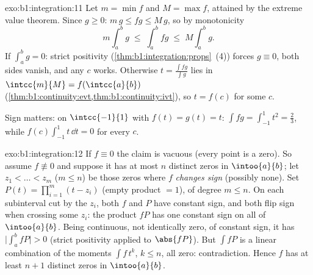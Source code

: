 \begin{solution}{exo:b1:integration:11}
Let $m = \min f$ and $M = \max f$, attained by the extreme value
theorem. Since $g \geq 0$: $m\,g \leq fg \leq M\,g$, so by
monotonicity
\[
m \int_a^b g \;\leq\; \int_a^b fg \;\leq\; M \int_a^b g .
\]
If $\int_a^b g = 0$: strict positivity
(\cref{thm:b1:integration:props}~(4)) forces $g \equiv 0$, both
sides vanish, and any $c$ works. Otherwise $t = \frac{\int
fg}{\int g}$ lies in $\intcc{m}{M} = f(\intcc{a}{b})$
(\cref{thm:b1:continuity:evt,thm:b1:continuity:ivt}), so $t =
f(c)$ for some $c$.

Sign matters: on $\intcc{-1}{1}$ with $f(t) = g(t) = t$: $\int
fg = \int_{-1}^1 t^2 = \frac23$, while $f(c)\int_{-1}^1 t\,\dd t
= 0$ for every $c$.
\end{solution}

\begin{solution}{exo:b1:integration:12}
If $f \equiv 0$ the claim is vacuous (every point is a zero). So
assume $f \not\equiv 0$ and suppose it has at most $n$ distinct
zeros in $\intoo{a}{b}$; let $z_1 < \dots < z_m$ ($m \leq n$) be
those zeros where $f$ \emph{changes sign} (possibly none). Set
$P(t) = \prod_{i=1}^{m}(t - z_i)$ (empty product $= 1$), of
degree $m \leq n$. On each subinterval cut by the $z_i$, both
$f$ and $P$ have constant sign, and both flip sign when crossing
some $z_i$: the product $fP$ has one constant sign on all of
$\intoo{a}{b}$. Being continuous, not identically zero, of
constant sign, it has $\bigl|\int_a^b fP\bigr| > 0$ (strict
positivity applied to $\abs{fP}$). But $\int f P$ is a linear
combination of the moments $\int f\,t^k$, $k \leq n$, all zero:
contradiction. Hence $f$ has at least $n + 1$ distinct zeros in
$\intoo{a}{b}$.
\end{solution}


